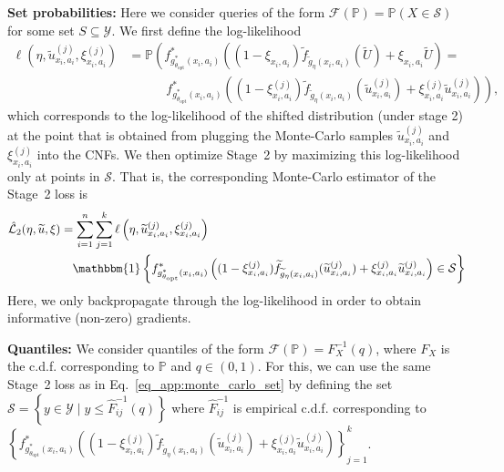 \documentclass{article} %
\theoremstyle{definition}
\theoremstyle{plain}
\begin{document}
\textbf{Set probabilities:} Here we consider queries of the form $\mathcal{F}(\mathbb{P}) = \mathbb{P}(X \in \mathcal{S})$ for some set $S \subseteq \mathcal{Y}$. We first define the log-likelihood
\begin{align}
\ell\left(\eta, \widetilde{u}_{x_i, a_i}^{(j)}, \xi_{x_i, a_i}^{(j)}\right) &= \mathbb{P} \left({f^\ast_{g^\ast_{\theta_\mathrm{opt}}(x_i, a_i)}}\left( (1 - \xi_{x_i, a_i}) \widetilde{f}_{\widetilde{g}_\eta(x_i, a_i)}(\widetilde{U}) +  \xi_{x_i, a_i} \widetilde{U}\right) \right. = \\ 
& \quad \quad \quad \left. {f^\ast_{g^\ast_{\theta_\mathrm{opt}}(x_i, a_i)}}\left((1 - \xi_{x_i, a_i}^{(j)}) \widetilde{f}_{\widetilde{g}_\eta(x_i, a_i)}(\widetilde{u}_{x_i, a_i}^{(j)}) +  \xi_{x_i, a_i}^{(j)} \widetilde{u}_{x_i, a_i}^{(j)} \right)\right),   
\end{align}
which corresponds to the log-likelihood of the shifted distribution (under stage 2) at the point that is obtained from plugging the Monte-Carlo samples $\widetilde{u}_{x_i, a_i}^{(j)}$ and $\xi_{x_i, a_i}^{(j)}$ into the CNFs. We then optimize Stage~2 by maximizing this log-likelihood only at points in $\mathcal{S}$. That is, the corresponding Monte-Carlo estimator of the Stage~2 loss is
\begin{align}\label{eq_app:monte_carlo_set}
    \hat{\mathcal{L}}_2(\eta, \widetilde{u}, \xi) &= \sum_{i=1}^n \sum_{j=1}^k \ell\left(\eta, \widetilde{u}_{x_i, a_i}^{(j)}, \xi_{x_i, a_i}^{(j)}\right) \\
    & \quad \mathbbm{1} \left\{{f^\ast_{g^\ast_{\theta_\mathrm{opt}}(x_i, a_i)}}\left((1 - \xi_{x_i, a_i}^{(j)}) \widetilde{f}_{\widetilde{g}_\eta(x_i, a_i)}(\widetilde{u}_{x_i, a_i}^{(j)}) +  \xi_{x_i, a_i}^{(j)} \widetilde{u}_{x_i, a_i}^{(j)}\right) \in \mathcal{S} \right\}
\end{align}
Here, we only backpropagate through the log-likelihood in order to obtain informative (non-zero) gradients.

\textbf{Quantiles:} We consider quantiles of the form $\mathcal{F}(\mathbb{P}) = F_X^{-1}(q)$, where $F_X$ is the c.d.f. corresponding to $\mathbb{P}$ and $q \in (0, 1)$. For this, we can use the same Stage~2 loss as in Eq.~\eqref{eq_app:monte_carlo_set} by defining the set $\mathcal{S} = \left\{y \in \mathcal{Y} \mid y \leq \hat{F}_{ij}^{-1}(q)\right\}$ where $\hat{F}_{ij}^{-1}$ is empirical c.d.f. corresponding to $\left\{ {f^\ast_{g^\ast_{\theta_\mathrm{opt}}(x_i, a_i)}}\left((1 - \xi_{x_i, a_i}^{(j)}) \widetilde{f}_{\widetilde{g}_\eta(x_i, a_i)}(\widetilde{u}_{x_i, a_i}^{(j)}) +  \xi_{x_i, a_i}^{(j)} \widetilde{u}_{x_i, a_i}^{(j)} \right)\right\}_{j=1}^k$.
\end{document}

